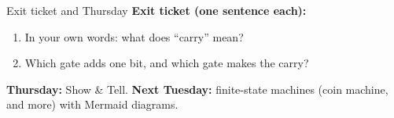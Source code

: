 \documentclass[aspectratio=169,10pt]{beamer}
\begin{document}
\begin{frame}{Exit ticket and Thursday}
\textbf{Exit ticket (one sentence each):}
\begin{enumerate}
\item In your own words: what does ``carry'' mean?
\item Which gate adds one bit, and which gate makes the carry?
\end{enumerate}
\vspace{6pt}
\textbf{Thursday:} Show \& Tell. \quad \textbf{Next Tuesday:} finite-state machines (coin machine, and more) with Mermaid diagrams.
\end{frame}
\end{document}
